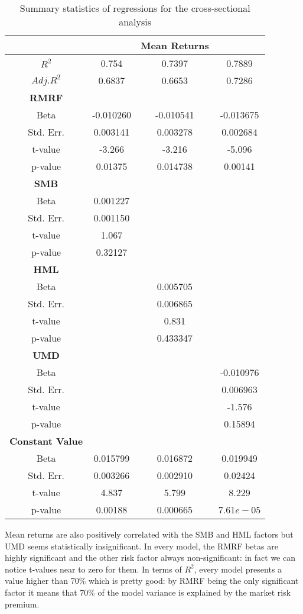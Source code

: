 \documentclass[11pt]{article}
\begin{document}
\begin{table}[H]
    \centering
    \begin{tabular}{cccc}
    \toprule\toprule
    & & \textbf{Mean Returns} & \\ 
    \midrule
    $R^2$  & 0.754 & 0.7397 & 0.7889 \\
    $Adj. R^2$ & 0.6837 & 0.6653 & 0.7286 \\
    \midrule
    \textbf{RMRF} \\
    Beta & -0.010260 & -0.010541 & -0.013675 \\
    Std. Err. & 0.003141 & 0.003278 & 0.002684 \\
    t-value & -3.266 & -3.216 & -5.096 \\
    p-value & 0.01375 & 0.014738 & 0.00141 \\
    \midrule
    \textbf{SMB} \\
    Beta & 0.001227 &  &  \\
    Std. Err. & 0.001150 &  & \\
    t-value & 1.067 &  &  \\
    p-value & 0.32127 &  &  \\
    \midrule
    \textbf{HML} \\
    Beta &  & 0.005705 &  \\
    Std. Err. &  & 0.006865 &   \\
    t-value &  & 0.831 &  \\
    p-value &  & 0.433347 &  \\
    \midrule
    \textbf{UMD} \\
    Beta &  &  & -0.010976 \\
    Std. Err. &  &  & 0.006963 \\
    t-value &  &  & -1.576 \\
    p-value &  &  & 0.15894 \\
    \midrule
    \textbf{Constant Value} \\
    Beta & 0.015799 &  0.016872 & 0.019949 \\
    Std. Err. &  0.003266 & 0.002910 & 0.02424 \\
    t-value & 4.837 & 5.799 & 8.229 \\
    p-value &  0.00188 & 0.000665 & 7.61$e-05$ \\
    \bottomrule
    \bottomrule
    \end{tabular}
    \caption{Summary statistics of regressions for the cross-sectional analysis} 
    \label{tab:summary_cross_section}
\end{table}
Mean returns are also positively correlated with 
the SMB and HML factors but UMD seems statistically insignificant. In every model, the RMRF betas are highly significant and the other risk factor always non-significant: 
in fact we can notice t-values near to zero for them. In terms of $R^2$, every model presents a value higher than 70\% which is pretty good: by RMRF being the only 
significant factor it means that 70\% of the model variance is explained by the market risk premium.
\end{document}
